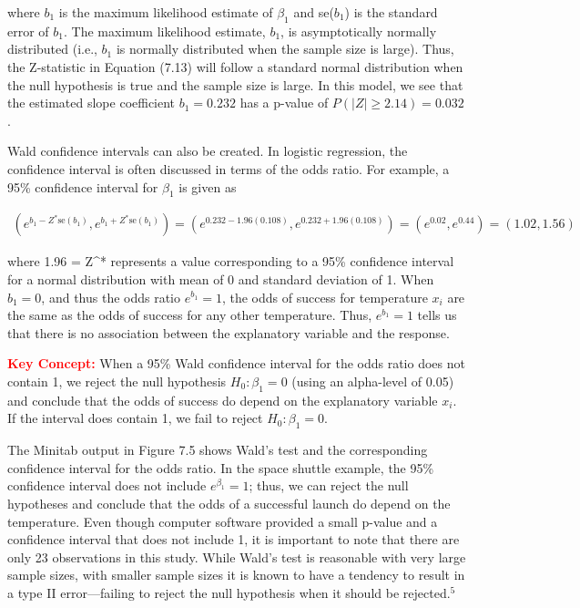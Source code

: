 \documentclass[
]{report}
\begin{document}
where \(b_1\) is the maximum likelihood estimate of \(\beta_1\) and se(\(b_1\)) is the standard error of \(b_1\). The maximum likelihood estimate, \(b_1\), is asymptotically normally distributed (i.e., \(b_1\) is normally distributed when the sample size is large). Thus, the Z-statistic in Equation (7.13) will follow a standard normal distribution when the null hypothesis is true and the sample size is large. In this model, we see that the estimated slope coefficient \(b_1 = 0.232\) has a p-value of \(P(|Z| \geq 2.14) = 0.032\).

Wald confidence intervals can also be created. In logistic regression, the confidence interval is often discussed in terms of the odds ratio. For example, a 95\% confidence interval for \(\beta_1\) is given as

\begin{align}
(e^{b_1 - Z^* \text{se}(b_1)}, e^{b_1 + Z^* \text{se}(b_1)}) = (e^{0.232 - 1.96(0.108)}, e^{0.232 + 1.96(0.108)}) = (e^{0.02}, e^{0.44}) = (1.02, 1.56) \tag{7.14}
\end{align}

where 1.96 = Z\^{}* represents a value corresponding to a 95\% confidence interval for a normal distribution with mean of 0 and standard deviation of 1. When \(b_1 = 0\), and thus the odds ratio \(e^{b_1} = 1\), the odds of success for temperature \(x_i\) are the same as the odds of success for any other temperature. Thus, \(e^{b_1} = 1\) tells us that there is no association between the explanatory variable and the response.

\Large

\textbf{\textcolor{red}{Key Concept:}}
\color{red}
When a 95\% Wald confidence interval for the odds ratio does not contain 1, we reject the null hypothesis \(H_0: \beta_1 = 0\) (using an alpha-level of 0.05) and conclude that the odds of success do depend on the explanatory variable \(x_i\). If the interval does contain 1, we fail to reject \(H_0: \beta_1 = 0\).
\color{black}
\normalsize

The Minitab output in Figure 7.5 shows Wald's test and the corresponding confidence interval for the
odds ratio. In the space shuttle example, the 95\% confidence interval does not include \(e^{\beta_1} = 1\); thus, we can
reject the null hypotheses and conclude that the odds of a successful launch do depend on the temperature.
Even though computer software provided a small p-value and a confidence interval that does not include 1, it
is important to note that there are only 23 observations in this study. While Wald's test is reasonable with very
large sample sizes, with smaller sample sizes it is known to have a tendency to result in a type II error---failing
to reject the null hypothesis when it should be rejected.\(^5\)
\end{document}
